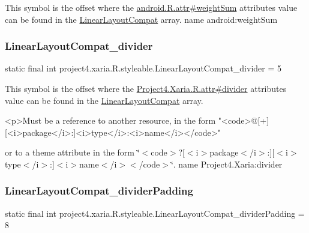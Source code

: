 This symbol is the offset where the \hyperlink{}{android.\+R.\+attr\#weight\+Sum} attribute\textquotesingle{}s value can be found in the \hyperlink{classproject4_1_1xaria_1_1R_1_1styleable_a7f929bdf7d740d51fa83ce463e56c432}{Linear\+Layout\+Compat} array.  name android\+:weight\+Sum \mbox{\label{classproject4_1_1xaria_1_1R_1_1styleable_a203fc5f441152f8ffcecb5604e918fa0}} 
\subsubsection{\texorpdfstring{Linear\+Layout\+Compat\+\_\+divider}{LinearLayoutCompat\_divider}}
{\footnotesize\ttfamily static final int project4.\+xaria.\+R.\+styleable.\+Linear\+Layout\+Compat\+\_\+divider = 5\hspace{0.3cm}{\ttfamily [static]}}

This symbol is the offset where the \hyperlink{}{Project4.\+Xaria.\+R.\+attr\#divider} attribute\textquotesingle{}s value can be found in the \hyperlink{classproject4_1_1xaria_1_1R_1_1styleable_a7f929bdf7d740d51fa83ce463e56c432}{Linear\+Layout\+Compat} array.

\begin{DoxyVerb}      <p>Must be a reference to another resource, in the form "<code>@[+][<i>package</i>:]<i>type</i>:<i>name</i></code>"
\end{DoxyVerb}
 or to a theme attribute in the form \char`\"{}$<$code$>$?\mbox{[}$<$i$>$package$<$/i$>$\+:\mbox{]}\mbox{[}$<$i$>$type$<$/i$>$\+:\mbox{]}$<$i$>$name$<$/i$>$$<$/code$>$\char`\"{}.  name Project4.\+Xaria\+:divider \mbox{\label{classproject4_1_1xaria_1_1R_1_1styleable_aabd76c769aacad577cc5b52c4a9cffb6}} 
\subsubsection{\texorpdfstring{Linear\+Layout\+Compat\+\_\+divider\+Padding}{LinearLayoutCompat\_dividerPadding}}
{\footnotesize\ttfamily static final int project4.\+xaria.\+R.\+styleable.\+Linear\+Layout\+Compat\+\_\+divider\+Padding = 8\hspace{0.3cm}{\ttfamily [static]}}

